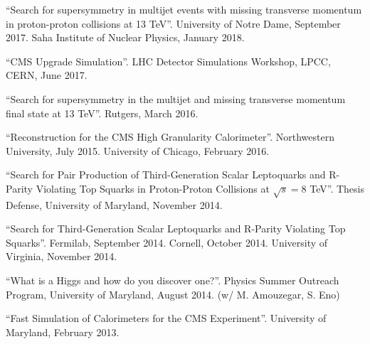 \begin{nbdescription}[leftmargin=12pt,font=\normalfont,labelsep=0em]
\item ``Search for supersymmetry in multijet events with missing transverse momentum in proton-proton collisions at 13 TeV''. University of Notre Dame, September 2017. Saha Institute of Nuclear Physics, January 2018.
\item ``CMS Upgrade Simulation''. LHC Detector Simulations Workshop, LPCC, CERN, June 2017.
\item ``Search for supersymmetry in the multijet and missing transverse momentum final state at 13 TeV''. Rutgers, March 2016.
\item ``Reconstruction for the CMS High Granularity Calorimeter''. Northwestern University, July 2015. University of Chicago, February 2016.
\item ``Search for Pair Production of Third-Generation Scalar Leptoquarks and R-Parity Violating Top Squarks in Proton-Proton Collisions at $\sqrt{s}=8$ TeV''. Thesis Defense, University of Maryland, November 2014.
\item ``Search for Third-Generation Scalar Leptoquarks and R-Parity Violating Top Squarks''. Fermilab, September 2014. Cornell, October 2014. University of Virginia, November 2014.
\item ``What is a Higgs and how do you discover one?''. Physics Summer Outreach Program, University of Maryland, August 2014. (w/ M. Amouzegar, S. Eno)
\item ``Fast Simulation of Calorimeters for the CMS Experiment''. University of Maryland, February 2013.
\end{nbdescription}

\ifdefined\longflag
